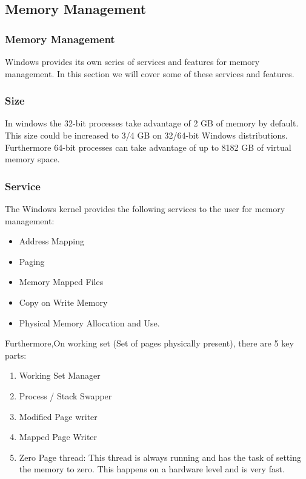 \documentclass[journal,10pt,onecolumn,compsoc,letterpaper,draftclsnofoot,table,xcdraw]{IEEEtran} \usepackage[margin=0.75in]{geometry}
\begin{document}
\subsection{Memory Management}
\subsubsection{Memory Management}
\noindent Windows provides its own series of services and features for memory management. In this section we will cover some of these services and features.
\subsubsection{Size}
\noindent In windows the 32-bit processes take advantage of 2 GB of memory by default. This size could be increased to 3/4 GB on 32/64-bit Windows distributions. Furthermore 64-bit processes can take advantage of up to 8182 GB of virtual memory space.
\subsubsection{Service}
\noindent The Windows kernel provides the following services to the user for memory management:
\begin{itemize}
\item Address Mapping
\item Paging
\item Memory Mapped Files
\item Copy on Write Memory
\item Physical Memory Allocation and Use.
\end{itemize}
\noindent Furthermore,On working set (Set of pages physically present), there are 5 key parts:
\begin{enumerate}
\item Working Set Manager
\item Process / Stack Swapper
\item Modified Page writer
\item Mapped Page Writer
\item Zero Page thread: This thread is always running and has the task of setting the memory to zero. This happens on a hardware level and is very fast.
\end{enumerate}
\end{document}
